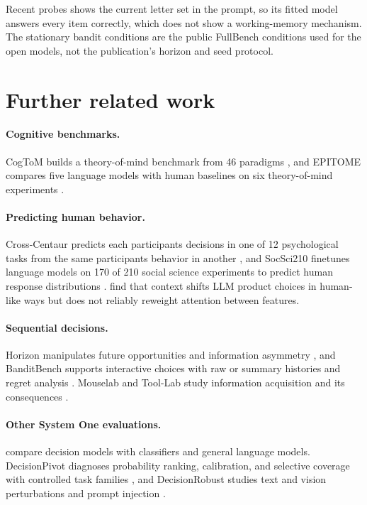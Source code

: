 \documentclass[11pt,a4paper]{article}
\begin{document}
Recent probes shows the current letter set in the prompt, so its fitted model answers every item correctly, which does not show a working-memory mechanism. The stationary bandit conditions are the public FullBench conditions used for the open models, not the publication's horizon and seed protocol.

\section{Further related work}
\label{app:related}
\paragraph{Cognitive benchmarks.}
CogToM builds a theory-of-mind benchmark from 46 paradigms \citep{tong2026cogtom}, and EPITOME compares five language models with human baselines on six theory-of-mind experiments \citep{jones2024epitome}.

\paragraph{Predicting human behavior.}
Cross-Centaur predicts each participant\textquotesingle{}s decisions in one of 12 psychological tasks from the same participant\textquotesingle{}s behavior in another \citep{asano2026crosscentaur}, and SocSci210 finetunes language models on 170 of 210 social science experiments to predict human response distributions \citep{kolluri2025socsci210}. \citet{sun2026choose} find that context shifts LLM product choices in human-like ways but does not reliably reweight attention between features.

\paragraph{Sequential decisions.}
Horizon manipulates future opportunities and information asymmetry \citep{wilson2014exploration}, and BanditBench supports interactive choices with raw or summary histories and regret analysis \citep{nie2025evolve}. Mouselab and Tool-Lab study information acquisition and its consequences \citep{callaway2022planning,wadi2026shopping}.

\paragraph{Other System One evaluations.}
\citet{rafe2026systemone} compare decision models with classifiers and general language models. DecisionPivot diagnoses probability ranking, calibration, and selective coverage with controlled task families \citep{zhuang2026decisionpivot}, and DecisionRobust studies text and vision perturbations and prompt injection \citep{lan2026decisionrobust}.
\end{document}

